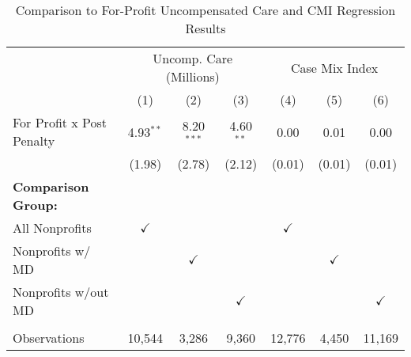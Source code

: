 \begin{table}[htbp]
   \caption{\label{tab:forprofit_uncomp_CMI_fullsample} Comparison to For-Profit Uncompensated Care and CMI Regression Results}
   \bigskip
   \centering
   \begin{tabular}{lcccccc}
      \toprule
       & \multicolumn{3}{c}{Uncomp. Care (Millions)} & \multicolumn{3}{c}{Case Mix Index}\\
                                  & (1)           & (2)           & (3)           & (4)           & (5)           & (6)\\  
      \midrule 
      For Profit x Post Penalty   & 4.93$^{**}$   & 8.20$^{***}$  & 4.60$^{**}$   & 0.00          & 0.01          & 0.00\\   
                                  & (1.98)        & (2.78)        & (2.12)        & (0.01)        & (0.01)        & (0.01)\\   
      \textbf{Comparison Group:}  &               &               &               &               &               & \\  
      All Nonprofits              & $\checkmark$  &               &               & $\checkmark$  &               & \\  
      Nonprofits w/ MD            &               & $\checkmark$  &               &               & $\checkmark$  & \\  
      Nonprofits w/out MD         &               &               & $\checkmark$  &               &               & $\checkmark$\\   
       \\
      Observations                & 10,544        & 3,286         & 9,360         & 12,776        & 4,450         & 11,169\\  
      \bottomrule
   \end{tabular}
\end{table}
